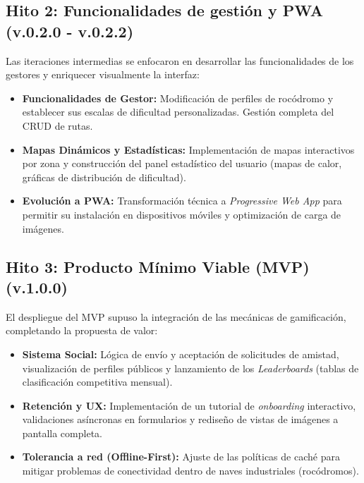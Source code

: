 \subsection{Hito 2: Funcionalidades de gestión y PWA (v.0.2.0 - v.0.2.2)}
Las iteraciones intermedias se enfocaron en desarrollar las funcionalidades de los gestores y enriquecer visualmente la interfaz:
\begin{itemize}
    \item \textbf{Funcionalidades de Gestor:} Modificación de perfiles de rocódromo y establecer sus escalas de dificultad personalizadas. Gestión completa del CRUD de rutas.
    \item \textbf{Mapas Dinámicos y Estadísticas:} Implementación de mapas interactivos por zona y construcción del panel estadístico del usuario (mapas de calor, gráficas de distribución de dificultad).
    \item \textbf{Evolución a PWA:} Transformación técnica a \textit{Progressive Web App} para permitir su instalación en dispositivos móviles y optimización de carga de imágenes.
\end{itemize}

\subsection{Hito 3: Producto Mínimo Viable (MVP) (v.1.0.0)}
El despliegue del MVP supuso la integración de las mecánicas de gamificación, completando la propuesta de valor:
\begin{itemize}
    \item \textbf{Sistema Social:} Lógica de envío y aceptación de solicitudes de amistad, visualización de perfiles públicos y lanzamiento de los \textit{Leaderboards} (tablas de clasificación competitiva mensual).
    \item \textbf{Retención y UX:} Implementación de un tutorial de \textit{onboarding} interactivo, validaciones asíncronas en formularios y rediseño de vistas de imágenes a pantalla completa.
    \item \textbf{Tolerancia a red (Offline-First):} Ajuste de las políticas de caché para mitigar problemas de conectividad dentro de naves industriales (rocódromos).
\end{itemize}

